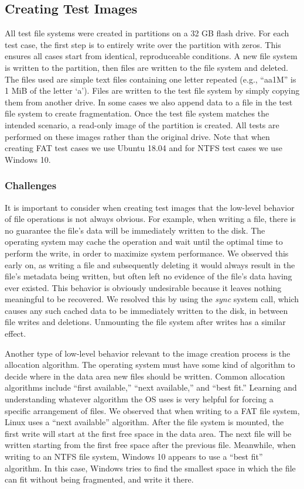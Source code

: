 \subsection{Creating Test Images}
All test file systems were created in partitions on a 32 GB flash drive. For each test case, the first step is to entirely write over the partition with zeros. This ensures all cases start from identical, reproduceable conditions. A new file system is written to the partition, then files are written to the file system and deleted. The files used are simple text files containing one letter repeated (e.g., ``aa1M'' is 1 MiB of the letter `a'). Files are written to the test file system by simply copying them from another drive. In some cases we also append data to a file in the test file system to create fragmentation. Once the test file system matches the intended scenario, a read-only image of the partition is created. All tests are performed on these images rather than the original drive. Note that when creating FAT test cases we use Ubuntu 18.04 and for NTFS test cases we use Windows 10.

\subsubsection{Challenges}
It is important to consider when creating test images that the low-level behavior of file operations is not always obvious. For example, when writing a file, there is no guarantee the file's data will be immediately written to the disk. The operating system may cache the operation and wait until the optimal time to perform the write, in order to maximize system performance. We observed this early on, as writing a file and subsequently deleting it would always result in the file's metadata being written, but often left no evidence of the file's data having ever existed. This behavior is obviously undesirable because it leaves nothing meaningful to be recovered. We resolved this by using the \emph{sync} system call, which causes any such cached data to be immediately written to the disk, in between file writes and deletions. Unmounting the file system after writes has a similar effect.

Another type of low-level behavior relevant to the image creation process is the allocation algorithm. The operating system must have some kind of algorithm to decide where in the data area new files should be written. Common allocation algorithms include ``first available,'' ``next available,'' and ``best fit.''
Learning and understanding whatever algorithm the OS uses is very helpful for forcing a specific arrangement of files. We observed that when writing to a FAT file system, Linux uses a ``next available'' algorithm. After the file system is mounted, the first write will start at the first free space in the data area. The next file will be written starting from the first free space after the previous file.
Meanwhile, when writing to an NTFS file system, Windows 10 appears to use a ``best fit'' algorithm. In this case, Windows tries to find the smallest space in which the file can fit without being fragmented, and write it there.

